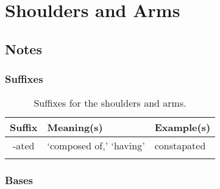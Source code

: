 %
%
%
\chapter{Shoulders and Arms}
\label{Shoulders} %








\abstract{}


\section{Notes}
\label{sec:NOTE10}



\subsection{Suffixes}

\begin{longtable}{c | p{} | p{}}
    \caption{Suffixes for the shoulders and arms.}
    \hline
    Suffix & Meaning(s) & Example(s) \\ \hline
        -ated & `composed of,' `having' & constapated \\
    \label{tab:Ch10Suffix}
\end{longtable}


\subsection{Bases}

